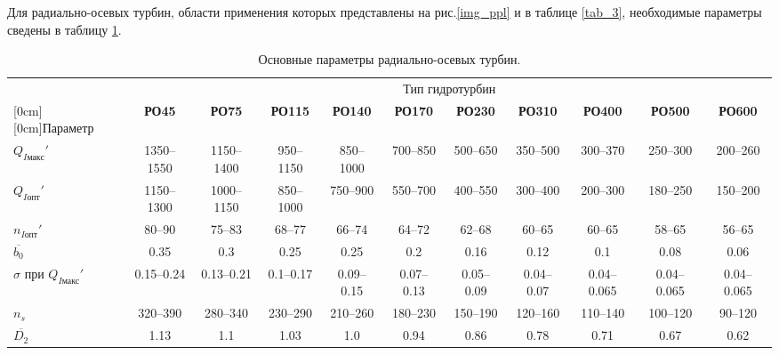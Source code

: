 Для радиально-осевых турбин, области применения которых представлены на рис.\ref{img_ppl} и в таблице \ref{tab_3}, необходимые параметры сведены в таблицу \ref{tab_4}.





\begin{landscape}


\renewcommand{\arraystretch}{1.4}
\begin{table}[ht]
\caption{Основные параметры радиально-осевых турбин.}
\label{tab_4}
\centering

\footnotesize
\begin{tabular}{|l|c|c|c|c|c|c|c|c|c|c|}



\hline
    & \multicolumn{10}{c|}{Тип гидротурбин} \\
\cline{2-11}


   \raisebox{1.5ex}[0cm][0cm]{Параметр} & \textbf{РО45} & \textbf{РО75} & \textbf{РО115} & \textbf{РО140} & \textbf{РО170} & \textbf{РО230} & \textbf{РО310} & \textbf{РО400} & \textbf{РО500} & \textbf{РО600} \\ 

\hline
  $Q_{I\text{макс}}'$ & 1350--1550 & 1150--1400 & 950--1150 & 850--1000 & 700--850 & 500--650 & 350--500 & 300--370 & 250--300 & 200--260 \\
\hline
  $Q_{I\text{опт}}'$  & 1150--1300 & 1000--1150 & 850--1000 & 750--900 & 550--700 & 400--550 & 300--400 & 200--300 & 180--250 & 150--200 \\
\hline
  $n_{I\text{опт}}'$  & 80--90 & 75--83 & 68--77 & 66--74 & 64--72 & 62--68 & 60--65 & 60--65 & 58--65 & 56--65 \\
\hline
  $\overline{b_0}$  & 0.35 & 0.3 & 0.25 & 0.25 & 0.2 & 0.16 & 0.12 & 0.1 & 0.08 & 0.06 \\
\hline
  $\sigma$ при $Q_{I\text{макс}}'$  & 0.15--0.24 & 0.13--0.21 & 0.1--0.17 & 0.09--0.15 & 0.07--0.13 & 0.05--0.09 & 0.04--0.07 & 0.04--0.065 & 0.04--0.065 & 0.04--0.065 \\

\hline
  $n_s$  & 320--390 & 280--340 & 230--290 & 210--260 & 180--230 & 150--190 & 120--160 & 110--140 & 100--120 & 90--120 \\
\hline
  $\overline{D_2}$  & 1.13 & 1.1 & 1.03 & 1.0 & 0.94 & 0.86 & 0.78 & 0.71 & 0.67 & 0.62 \\




\hline
\end{tabular}
\end{table}


\end{landscape}
